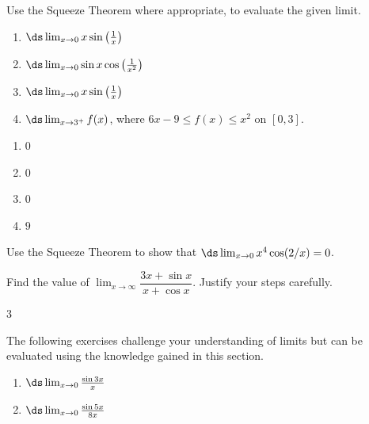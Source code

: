 \begin{enumialphparenastyle}
\begin{ex}
{Use the Squeeze Theorem where appropriate, to evaluate the given limit.}

\begin{enumerate}
\item {$\ds \lim_{x\to0} x\sin\left(\frac{1}{x}\right)$}

\item {$\ds \lim_{x\to0} \sin x\cos\left(\frac{1}{x^2}\right)$}

\item {$\ds \lim_{x\to0} x\sin\left(\frac{1}{x}\right)$}

\item {$\ds \lim_{x\to3^+} f(x)$, where $6x-9\leq f(x) \leq x^2$ on $[0,3]$.}

\end{enumerate}

\begin{sol}
\begin{enumerate}
\item {$0$}
\item {$0$}
\item {$0$}
\item {$9$}
\end{enumerate}
\end{sol}

\end{ex}





\begin{ex} 
Use the Squeeze Theorem to show that $\ds\lim_{x\to0} x^4 \cos(2/x)=0$.
\end{ex}


\begin{ex}
Find the value of $\lim_{x\to\infty}\dfrac{3x+\sin x}{x+\cos x}$. Justify your steps carefully.
\begin{sol}
	$ 3 $
\end{sol}
\end{ex}


\begin{ex}
{\noindent The following exercises}
{ challenge your understanding of limits but can be evaluated using the knowledge gained in this section.}
\begin{enumerate}
\item {$\ds \lim_{x\to0}\frac{\sin 3x}{x}$}

\item {$\ds \lim_{x\to0}\frac{\sin 5x}{8x}$}


\end{enumerate}
\end{ex}
\end{enumialphparenastyle}
